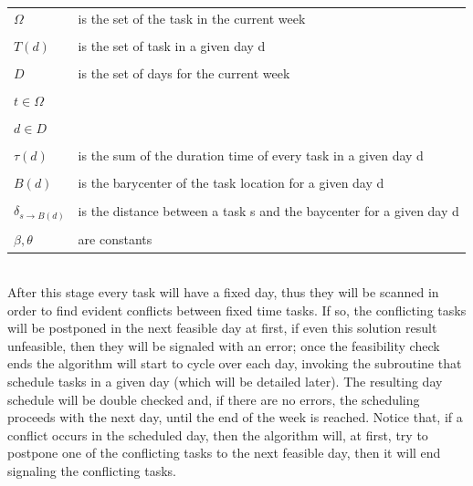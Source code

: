     \begin{table}[H]
        \centering
        \begin{tabular}{p{2.3cm} p{7cm}}
            \\ $ \Omega$ & is the set of the task in the current week \\
            \\ $ T(d) $  & is the set of task in a given day d \\
            \\ $ D $     & is the set of days for the current week  \\
            \\ $t \in \Omega $ &  \\
            \\ $ d \in D $ & \\
            \\ $ \tau(d)$ & is the sum of the duration time of every task in a given day d  \\
            \\ $ B(d) $ & is the barycenter of the task location for a given day d\\
            \\ $\delta_{s \rightarrow B(d)}$ & is the distance between a task s and the baycenter for a given day d\\
            \\ $\beta, \theta$ & are constants  \\
        \end{tabular}
    \end{table}
    
\\After this stage every task will have a fixed day, thus they will be scanned in order to find evident conflicts between fixed time tasks.
If so, the conflicting tasks will be postponed in the next feasible day at first, if even this solution result unfeasible, then they will be signaled with an error; once the feasibility check ends the algorithm will start to cycle over each day, invoking the subroutine that schedule tasks in a given day (which will be detailed later). 
 The resulting day schedule will be double checked and, if there are no errors, the scheduling proceeds with the next day, until the end of the week is reached. Notice that, if a conflict occurs in the scheduled day, then the algorithm will, at first, try to postpone one of the conflicting tasks to the next feasible day, then it will end signaling the conflicting tasks.   
 
